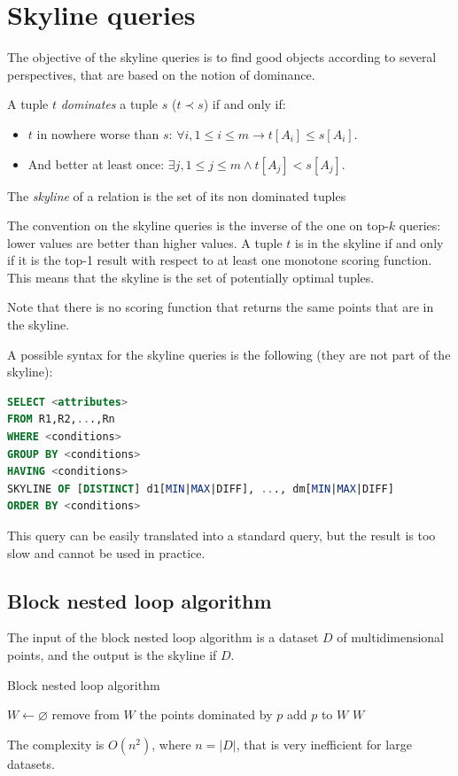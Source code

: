 \documentclass[12pt, a4paper]{report}
\newtheorem[style=M,bodystyle=\normalfont]{theorem}{Theorem}
\newtheorem[style=M,bodystyle=\normalfont]{corollary}{Corollary}
\newtheorem[style=M,bodystyle=\normalfont]{lemma}{Lemma}
\newtheorem[style=M,bodystyle=\normalfont]{definition}{Definition}
\begin{document}
    \section{Skyline queries}
    The objective of the skyline queries is to find good objects according to several perspectives, that are based on the notion of dominance. 
    \begin{definition}
        A tuple $t$ \emph{dominates} a tuple $s$ ($t \prec s$) if and only if: 
        \begin{itemize}
            \item $t$ in nowhere worse than $s$: $\forall i, 1 \leq i \leq m \rightarrow t[A_i] \leq s[A_i]$.
            \item And better at least once: $\exists j, 1 \leq j \leq m \land t[A_j] < s[A_j]$.
        \end{itemize}

        The \emph{skyline} of a relation is the set of its non dominated tuples
    \end{definition}
    The convention on the skyline queries is the inverse of the one on top-$k$ queries: lower values are better than higher values. A tuple $t$ is in the skyline if
    and only if  it is the top-1 result with respect to at least one monotone scoring function. This means that the skyline is the set of potentially optimal tuples.  

    Note that there is no scoring function that returns the same points that are in the skyline. 

    A possible syntax for the skyline queries is the following (they are not part of the skyline): 
    \begin{lstlisting}[language=SQL]
SELECT <attributes>
FROM R1,R2,...,Rn
WHERE <conditions>
GROUP BY <conditions>
HAVING <conditions>
SKYLINE OF [DISTINCT] d1[MIN|MAX|DIFF], ..., dm[MIN|MAX|DIFF]
ORDER BY <conditions>
    \end{lstlisting}
    This query can be easily translated into a standard query, but the result is too slow and cannot be used in practice. 

    \subsection{Block nested loop algorithm}
    The input of the block nested loop algorithm is a dataset $D$ of multidimensional points, and the output is the skyline if $D$.
    \begin{algorithm}[H]
        \caption{Block nested loop algorithm}
            \begin{algorithmic}[1]
                \State $W \leftarrow \varnothing$
                        \State remove from $W$ the points dominated by $p$
                        \State add $p$ to $W$
                    \EndIf
                \EndFor
                \State \Return $W$
            \end{algorithmic}
    \end{algorithm}
    The complexity is $O(n^2)$, where $n=\left\lvert D \right\rvert $, that is very inefficient for large datasets. 
\end{document}
